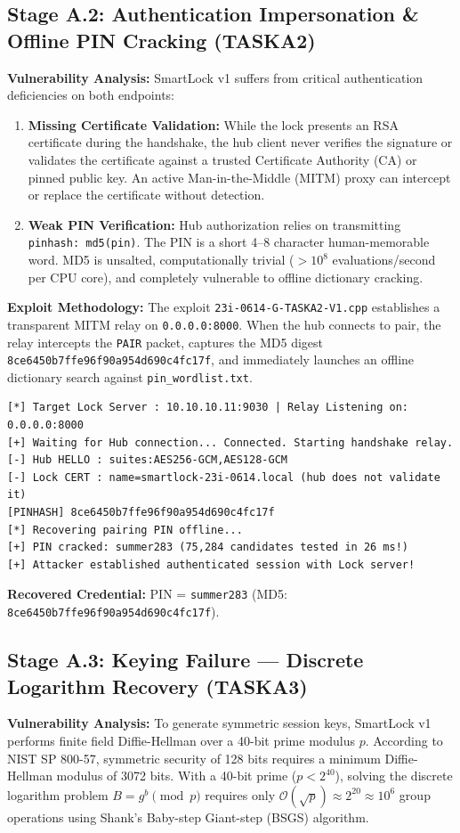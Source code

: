 \documentclass[11pt,a4paper]{article}
\begin{document}
\subsection{Stage A.2: Authentication Impersonation \& Offline PIN Cracking (TASKA2)}
\textbf{Vulnerability Analysis:}  
SmartLock v1 suffers from critical authentication deficiencies on both endpoints:
\begin{enumerate}
    \item \textbf{Missing Certificate Validation:} While the lock presents an RSA certificate during the handshake, the hub client never verifies the signature or validates the certificate against a trusted Certificate Authority (CA) or pinned public key. An active Man-in-the-Middle (MITM) proxy can intercept or replace the certificate without detection.
    \item \textbf{Weak PIN Verification:} Hub authorization relies on transmitting \texttt{pinhash: md5(pin)}. The PIN is a short 4--8 character human-memorable word. MD5 is unsalted, computationally trivial ($>10^8$ evaluations/second per CPU core), and completely vulnerable to offline dictionary cracking.
\end{enumerate}

\textbf{Exploit Methodology:}  
The exploit \texttt{23i-0614-G-TASKA2-V1.cpp} establishes a transparent MITM relay on \texttt{0.0.0.0:8000}. When the hub connects to pair, the relay intercepts the \texttt{PAIR} packet, captures the MD5 digest \texttt{8ce6450b7ffe96f90a954d690c4fc17f}, and immediately launches an offline dictionary search against \texttt{pin\_wordlist.txt}.

\begin{lstlisting}[caption={Stage A.2 Terminal Output (\texttt{23i-0614-G-TASKA2-V1})}]
[*] Target Lock Server : 10.10.10.11:9030 | Relay Listening on: 0.0.0.0:8000
[+] Waiting for Hub connection... Connected. Starting handshake relay.
[-] Hub HELLO : suites:AES256-GCM,AES128-GCM
[-] Lock CERT : name=smartlock-23i-0614.local (hub does not validate it)
[PINHASH] 8ce6450b7ffe96f90a954d690c4fc17f
[*] Recovering pairing PIN offline...
[+] PIN cracked: summer283 (75,284 candidates tested in 26 ms!)
[+] Attacker established authenticated session with Lock server!
\end{lstlisting}
\textbf{Recovered Credential:} PIN = \texttt{summer283} (MD5: \texttt{8ce6450b7ffe96f90a954d690c4fc17f}).

\subsection{Stage A.3: Keying Failure --- Discrete Logarithm Recovery (TASKA3)}
\textbf{Vulnerability Analysis:}  
To generate symmetric session keys, SmartLock v1 performs finite field Diffie-Hellman over a 40-bit prime modulus $p$. According to NIST SP 800-57, symmetric security of 128 bits requires a minimum Diffie-Hellman modulus of 3072 bits. With a 40-bit prime ($p < 2^{40}$), solving the discrete logarithm problem $B = g^b \pmod p$ requires only $\mathcal{O}(\sqrt{p}) \approx 2^{20} \approx 10^6$ group operations using Shank's Baby-step Giant-step (BSGS) algorithm.
\end{document}
